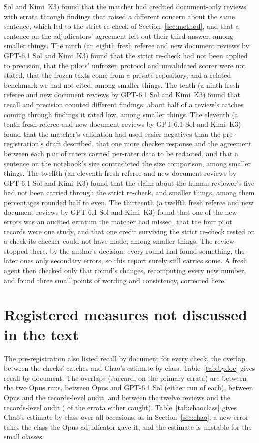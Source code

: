 \documentclass[11pt]{article}
\begin{document}
Sol and Kimi~K3) found that the matcher had credited document-only reviews with errata through findings that raised a different
concern about the same sentence, which led to the strict re-check of Section~\ref{sec:method}, and that a sentence on the adjudicators' agreement
left out their third answer, among smaller things. The ninth
(an eighth fresh referee and new document reviews by GPT-6.1 Sol and Kimi~K3) found that the strict re-check had not been applied
to precision, that the pilots' unfrozen protocol and unvalidated scorer were not stated, that the frozen texts come from a private
repository, and a related benchmark we had not cited, among smaller things. The tenth
(a ninth fresh referee and new document reviews by GPT-6.1 Sol and Kimi~K3) found that recall and precision counted different
findings, about half of a review's catches coming through findings it rated low, among smaller things. The eleventh (a tenth
fresh referee and new document reviews by GPT-6.1 Sol and Kimi~K3) found that the matcher's validation had used easier negatives
than the pre-registration's draft described, that one more checker response and the agreement between each pair of raters carried
per-rater data to be redacted, and that a sentence on the notebook's size contradicted the size comparison, among smaller things. The twelfth (an
eleventh fresh referee and new document reviews by GPT-6.1 Sol and Kimi~K3) found that the claim about the human reviewer's five
had not been carried through the strict re-check, and smaller things, among them percentages rounded half to even. The
thirteenth (a twelfth fresh referee and new document reviews by GPT-6.1 Sol and Kimi~K3) found that one of the new errors was an
audited erratum the matcher had missed, that the four pilot records were one study, and that one credit surviving the strict re-check
rested on a check its checker could not have made, among smaller things. The review stopped there, by the author's decision: every
round had found something, the later ones only secondary errors, so this report surely still carries some. A fresh agent then
checked only that round's changes, recomputing every new number, and found three small points of wording and consistency, corrected
here.

\section{Registered measures not discussed in the text}
\label{app:registered}

The pre-registration also listed recall by document for every check, the overlap between the checks' catches and Chao's estimate by
class. Table~\ref{tab:bydoc} gives recall by document. The overlaps (Jaccard, on the primary errata) are \JacOpusRuns{} between the
two Opus runs, \JacOpusGpt{} between Opus and GPT-6.1 Sol (either run of each), \JacOpusCtwo{} between Opus and the records-level
audit, and \JacConeCtwo{} between the twelve reviews and the records-level audit (\JacConeCtwoInter{} of the \JacConeCtwoUnion{}
errata either caught). Table~\ref{tab:chaoclass} gives Chao's estimate by
class over all occasions, as in Section~\ref{sec:chao}; a new error takes the class the Opus adjudicator gave it, and the estimate
is unstable for the small classes.
\end{document}
